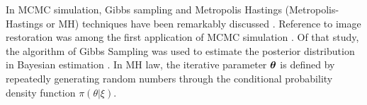 In MCMC simulation, Gibbs sampling and Metropolis Hastings (Metropolis-Hastings or MH) techniques have been remarkably discussed \citep{wago,danihed}. Reference to image restoration was among the first application of MCMC simulation \citep{gibbs1}. Of that study, the algorithm of Gibbs Sampling was used to estimate the posterior distribution in Bayesian estimation \citep{gibbs2}. In MH law, the iterative parameter $\mbox{\boldmath$\theta$}$ is defined by repeatedly generating random numbers through the conditional probability density function $\pi (\left. {\theta} \right|\xi)$.
%
